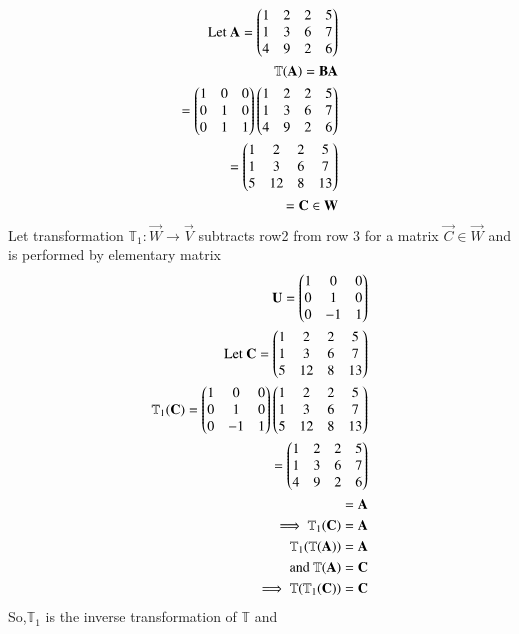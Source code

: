\begin{align}
    \text{Let }\mathbf{A}=\begin{pmatrix}1&2&2&5\\1&3&6&7\\4&9&2&6\end{pmatrix}\\
    \mathbb{T}(\mathbf{A})=\mathbf{B}\mathbf{A}\\=
    \begin{pmatrix}1&0&0\\0&1&0\\0&1&1\end{pmatrix}\begin{pmatrix}1&2&2&5\\1&3&6&7\\4&9&2&6\end{pmatrix}\\
    =\begin{pmatrix}1&2&2&5\\1&3&6&7\\5&12&8&13\end{pmatrix}\\
    =\mathbf{C} \in \mathbf{W}
\end{align}
Let transformation $\mathbb{T}_1:\vec{W} \rightarrow \vec{V}$ subtracts row2 from row 3 for a matrix $\vec{C} \in \vec{W}$ and is performed by elementary matrix
\begin{align}
\mathbf{U}=\begin{pmatrix}1&0&0\\0&1&0\\0&-1&1\end{pmatrix}\\
     \text{Let }\mathbf{C}=\begin{pmatrix}1&2&2&5\\1&3&6&7\\5&12&8&13\end{pmatrix}\\
     \mathbb{T}_1(\mathbf{C})=\begin{pmatrix}1&0&0\\0&1&0\\0&-1&1\end{pmatrix}\begin{pmatrix}1&2&2&5\\1&3&6&7\\5&12&8&13\end{pmatrix}\\
     =\begin{pmatrix}1&2&2&5\\1&3&6&7\\4&9&2&6\end{pmatrix}\\=\mathbf{A}\\
     \implies \mathbb{T}_1(\mathbf{C})=\mathbf{A}\\
     \mathbb{T}_1(\mathbb{T}(\mathbf{A}))=\mathbf{A}\\
     \text{and  } \mathbb{T}(\mathbf{A})=\mathbf{C}\\
     \implies \mathbb{T}(\mathbb{T}_1(\mathbf{C}))=\mathbf{C}
     \end{align}
     So,$\mathbb{T}_1$ is the inverse transformation of $\mathbb{T}$ and
